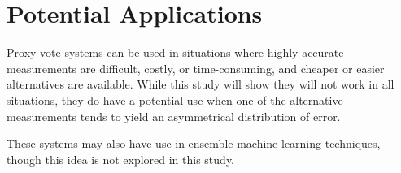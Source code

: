 \section{Potential Applications}\label{sec:potential-applications}
Proxy vote systems can be used in situations where highly accurate measurements are
difficult, costly, or time-consuming, and cheaper or easier alternatives are available.
While this study will show they will not work in all situations, they do have a
potential use when one of the alternative measurements tends to yield an asymmetrical
distribution of error.

These systems may also have use in ensemble machine learning techniques, though this
idea is not explored in this study.
